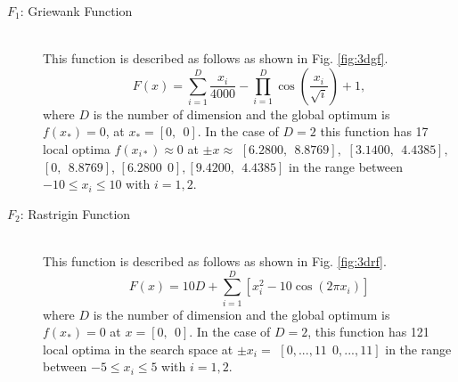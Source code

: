\documentclass{ies2018}
\begin{document}
 \begin{description}
\item[$F_1$: Griewank Function]\mbox{}\\
This function is described as follows as shown in Fig. \ref{fig:3dgf}.
\begin{equation}
F(x)= \sum_{i=1}^D \frac{x_{i}}{4000} - \prod_{i=1}^D \cos(\frac{x_i}{\sqrt{i}}) + 1,
\end{equation}
where $D$ is the number of dimension and the global optimum is ${f(x_*)}=0$, at $x_* = {[0, \ \ 0]}$. In the case of $D=2$ this function has 17 local optima ${f(x_{i*}) \approx 0}$ at ${\pm x \approx}$ ${ [6.2800, \ \ 8.8769],}$ ${[3.1400, \ \ 4.4385],}$  ${[0, \ \ 8.8769]}$, ${[6.2800 \ \ 0], [9.4200, \ \ 4.4385]}$ in the range between ${-10 \leq x_i \leq 10}$ with $i=1,2$.

\item[$F_2$: Rastrigin Function]\mbox{}\\
 This function is described as follows as shown in Fig. \ref{fig:3drf}.
 \begin{equation}
F(x)= 10D+\sum_{i=1}^D [x_i^2-10 \cos(2\pi x_i)]
\end{equation}
where $D$ is the number of dimension and the global optimum is ${f(x_*)=0}$ at ${x=[0, \ \ 0]}$. In the case of $D=2$, this function has 121 local optima in the search space at ${ \pm x_i=}$ ${[0,...,11 \ \ 0,...,11]}$ in the range between $-5 \leq x_i \leq 5$ with $i=1,2$.

\end{description}
\end{document}
